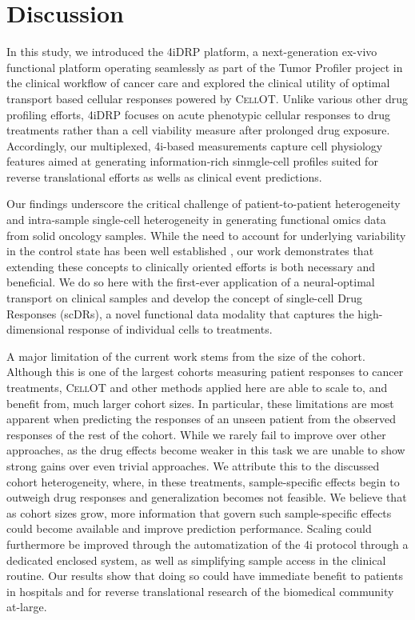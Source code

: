 \section{Discussion}
In this study, we introduced the 4iDRP platform, a next-generation ex-vivo functional platform operating seamlessly as part of the Tumor Profiler project in the clinical workflow of cancer care and explored the clinical utility of optimal transport based cellular responses powered by \textsc{CellOT}.
Unlike various other drug profiling efforts, 4iDRP focuses on acute phenotypic cellular responses to drug treatments rather than a cell viability measure after prolonged drug exposure. 
Accordingly, our multiplexed, 4i-based measurements capture cell physiology features aimed at generating information-rich sinmgle-cell profiles suited for reverse translational efforts as wells as clinical event predictions. 

Our findings underscore the critical challenge of patient-to-patient heterogeneity and intra-sample single-cell heterogeneity in generating functional omics data from solid oncology samples.
While the need to account for underlying variability in the control state has been well established \cite{icgc2020},
our work demonstrates that extending these concepts to clinically oriented efforts is both necessary and beneficial.
We do so here with the first-ever application of a neural-optimal transport on clinical samples and develop the concept of single-cell Drug Responses (scDRs), a novel functional data modality that captures the high-dimensional response of individual cells to treatments.

A major limitation of the current work stems from the size of the cohort.
Although this is one of the largest cohorts measuring patient responses to cancer treatments, \textsc{CellOT} and other methods applied here are able to scale to, and benefit from, much larger cohort sizes.
In particular, these limitations are most apparent when predicting the responses of an unseen patient from the observed responses of the rest of the cohort.
While we rarely fail to improve over other approaches, as the drug effects become weaker in this task we are unable to show strong gains over even trivial approaches.
We attribute this to the discussed cohort heterogeneity,
where, in these treatments, sample-specific effects begin to outweigh drug responses and generalization becomes not feasible.
We believe that as cohort sizes grow, more information that govern such sample-specific effects could become available and improve prediction performance.
Scaling could furthermore be improved through the automatization of the 4i protocol through a dedicated enclosed system, as well as simplifying sample access in the clinical routine.
Our results show that doing so could have immediate benefit to patients in hospitals and for reverse translational research of the biomedical community at-large.  

